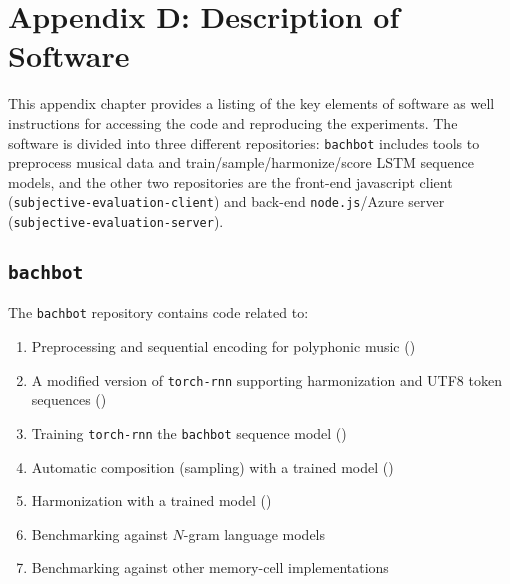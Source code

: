 \chapter{Appendix D: Description of Software}\label{sec:software}

\ifpdf
    \graphicspath{{Appendix4/Figs/Raster/}{Appendix4/Figs/PDF/}{Appendix4/Figs/}}
\else
    \graphicspath{{Appendix4/Figs/Vector/}{Appendix4/Figs/}}
\fi

This appendix chapter provides a listing of the key elements of software as
well instructions for accessing the code and reproducing the experiments. The
software is divided into three different repositories: \texttt{bachbot}
includes tools to preprocess musical data and train/sample/harmonize/score LSTM
sequence models, and the other two repositories are the front-end javascript
client (\texttt{subjective-evaluation-client}) and back-end \texttt{node.js}/Azure
server (\texttt{subjective-evaluation-server}).

\section{\texttt{bachbot}}

The \texttt{bachbot} repository contains code related to:
\begin{enumerate}
    \item Preprocessing and sequential encoding for polyphonic music ()
    \item A modified version of \texttt{torch-rnn} supporting harmonization and
        UTF8 token sequences ()
    \item Training \texttt{torch-rnn} the \texttt{bachbot} sequence model ()
    \item Automatic composition (\ie sampling) with a trained model ()
    \item Harmonization with a trained model ()
    \item Benchmarking against $N$-gram language models 
    \item Benchmarking against other memory-cell implementations 
\end{enumerate}

